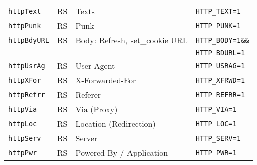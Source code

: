 \documentclass[documentation]{subfiles}
\begin{document}
\begin{longtable}{llll}
    {\tt httpText}    & RS & Texts        & {\tt HTTP\_TEXT=1}\\
    {\tt httpPunk}    & RS & Punk        & {\tt HTTP\_PUNK=1}\\
    {\tt httpBdyURL}  & RS & Body: Refresh, set\_cookie URL & {\tt HTTP\_BODY=1\&\&}\\
                                                          &&& {\tt HTTP\_BDURL=1}\\
    {\tt httpUsrAg} & RS & User-Agent               & {\tt HTTP\_USRAG=1}\\
    {\tt httpXFor}  & RS & X-Forwarded-For          & {\tt HTTP\_XFRWD=1}\\
    {\tt httpRefrr} & RS & Referer                  & {\tt HTTP\_REFRR=1}\\
    {\tt httpVia}   & RS & Via (Proxy)              & {\tt HTTP\_VIA=1}\\
    {\tt httpLoc}   & RS & Location (Redirection)   & {\tt HTTP\_LOC=1}\\
    {\tt httpServ}  & RS & Server                   & {\tt HTTP\_SERV=1}\\
    {\tt httpPwr}   & RS & Powered-By / Application & {\tt HTTP\_PWR=1}\\
    \bottomrule
\end{longtable}
\end{document}
